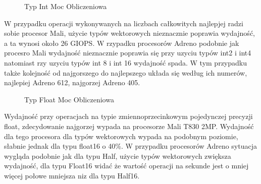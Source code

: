 \begin{figure}[H]
\caption{Typ Int Moc Obliczeniowa}
\end{figure}
W przypadku operacji wykonywanych na liczbach całkowitych najlepjej radzi sobie procesor Mali, użycie typów wektorowych nieznacznie poprawia wydajność, a ta wynosi około 26 GIOPS. W rzypadku procesorów Adreno podobnie jak procesro Mali wydajność nieznacznie poprawia się przy uzyciu typów int2 i int4 natomiast rzy uzyciu typów int 8 i int 16 wydajność spada. W tym przypadku także kolejność od najgorszego do najlepszego układa się według ich numerów, najlepiej Adreno 612, najgorzej Adreno 405.
\begin{figure}[H]
\caption{Typ Float Moc Obliczeniowa}
\end{figure}
Wydajność przy operacjach na typie zmiennoprzecinkowym pojedynczej precyzji float, zdecydowanie najgorzej wypada na procesorze Mali T830 2MP. Wydajność dla tego procesora dla typów wektorowych wypada na podobnym poziomie, słabnie jednak dla typu float16 o 40\%. W przypadku procesorów Adreno sytuacja wygląda podobnie jak dla typu Half, użycie typów wektorowych zwiększa wydajność, dla typu Float16 widać że wartość operacji na sekunde jest o mniej więcej połowe mniejsza niz dla typu Half16.
